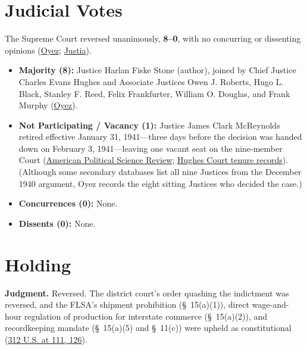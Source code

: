 \documentclass[12pt]{article}
\begin{document}
\section{Judicial Votes}

The Supreme Court reversed unanimously, \textbf{8--0}, with no concurring or dissenting opinions (\href{https://www.oyez.org/cases/1940-1955/312us100}{Oyez}; \href{https://supreme.justia.com/cases/federal/us/312/100/}{Justia}).

\begin{itemize}
\item \textbf{Majority (8):} Justice Harlan Fiske Stone (author), joined by Chief Justice Charles Evans Hughes and Associate Justices Owen J. Roberts, Hugo L. Black, Stanley F. Reed, Felix Frankfurter, William O. Douglas, and Frank Murphy (\href{https://www.oyez.org/cases/1940-1955/312us100}{Oyez}).
\item \textbf{Not Participating / Vacancy (1):} Justice James Clark McReynolds retired effective January 31, 1941---three days before the decision was handed down on February 3, 1941---leaving one vacant seat on the nine-member Court (\href{https://www.cambridge.org/core/journals/american-political-science-review/article/constitutional-law-in-19401941-the-constitutional-decisions-of-the-supreme-court-of-the-united-states-in-the-october-term-1940/FD13DE1C1017FD7C2C676714F9E05EC0}{American Political Science Review}; \href{https://en.wikipedia.org/wiki/List_of_United_States_Supreme_Court_cases,_volume_289}{Hughes Court tenure records}). (Although some secondary databases list all nine Justices from the December 1940 argument, Oyez records the eight sitting Justices who decided the case.)
\item \textbf{Concurrences (0):} None.
\item \textbf{Dissents (0):} None.
\end{itemize}

\section{Holding}

\textbf{Judgment.} Reversed. The district court's order quashing the indictment was reversed, and the FLSA's shipment prohibition (\S~15(a)(1)), direct wage-and-hour regulation of production for interstate commerce (\S~15(a)(2)), and recordkeeping mandate (\S~15(a)(5) and \S~11(c)) were upheld as constitutional (\href{https://supreme.justia.com/cases/federal/us/312/100/}{312 U.S. at 111, 126}).
\end{document}
